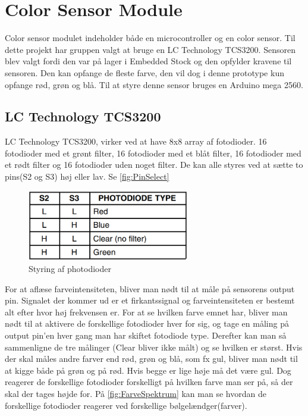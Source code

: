 \graphicspath{{Chapters/Teori/}}


\section{Color Sensor Module}
Color sensor modulet indeholder både en microcontroller og en color sensor. Til dette projekt har gruppen valgt at bruge en LC Technology TCS3200. Sensoren blev valgt fordi den var på lager i Embedded Stock og den opfylder kravene til sensoren. Den kan opfange de fleste farve, den vil dog i denne prototype kun opfange rød, grøn og blå. Til at styre denne sensor bruges en Arduino mega 2560.

\subsection{LC Technology TCS3200}
LC Technology TCS3200, virker ved at have 8x8 array af fotodioder. 16 fotodioder med et grønt filter, 16 fotodioder med et blåt filter, 16 fotodioder med et rødt filter og 16 fotodioder uden noget filter. De kan alle styres ved at sætte to pins(S2 og S3) høj eller lav. \cite{man:TC3200} Se \autoref{fig:PinSelect}

\begin{figure}[H]
	\centering
	\includegraphics[width = 200pt]{Img/S1S2_color.png}
	\caption{Styring af photodioder}
	\label{fig:PinSelect}
\end{figure}

For at aflæse farveintensiteten, bliver man nødt til at måle på sensorens output pin. Signalet der kommer ud er et firkantssignal og farveintensiteten er bestemt alt efter hvor høj frekvensen er. For at se hvilken farve emnet har, bliver man nødt til at aktivere de forskellige fotodioder hver for sig, og tage en måling på output pin'en hver gang man har skiftet fotodiode type. Derefter kan man så sammenligne de tre målinger (Clear bliver ikke målt) og se hvilken er størst. Hvis der skal måles andre farver end rød, grøn og blå, som fx gul, bliver man nødt til at kigge både på grøn og på rød. Hvis begge er lige høje må det være gul. Dog reagerer de forskellige fotodioder forskelligt på hvilken farve man ser på, så der skal der tages højde for. På \autoref{fig:FarveSpektrum} kan man se hvordan de forskellige fotodioder reagerer ved forskellige bølgelændger(farver)\cite{man:TC3200}.

